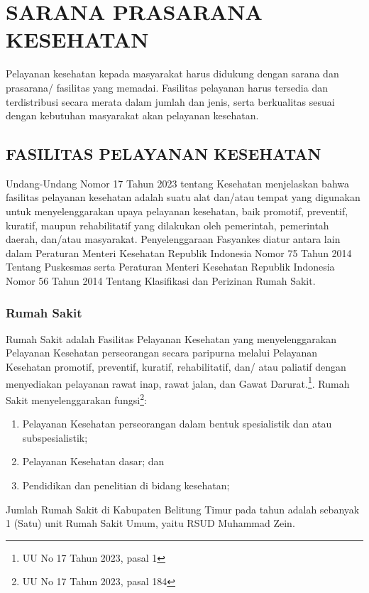 \chapter{SARANA PRASARANA KESEHATAN}
Pelayanan kesehatan kepada masyarakat harus didukung dengan sarana dan prasarana/ fasilitas yang memadai. Fasilitas pelayanan harus tersedia dan terdistribusi secara merata dalam jumlah dan jenis, serta berkualitas sesuai dengan kebutuhan masyarakat akan pelayanan kesehatan. 

\section{FASILITAS PELAYANAN KESEHATAN}
Undang-Undang Nomor 17 Tahun 2023 tentang Kesehatan menjelaskan bahwa fasilitas pelayanan kesehatan adalah suatu alat dan/atau tempat yang digunakan untuk menyelenggarakan upaya pelayanan kesehatan, baik promotif, preventif, kuratif, maupun rehabilitatif yang dilakukan oleh pemerintah, pemerintah daerah, dan/atau masyarakat. Penyelenggaraan Fasyankes diatur antara lain dalam Peraturan Menteri Kesehatan Republik Indonesia Nomor 75 Tahun 2014 Tentang Puskesmas serta Peraturan Menteri Kesehatan Republik Indonesia Nomor 56 Tahun 2014 Tentang Klasifikasi dan Perizinan Rumah Sakit.

\subsection{Rumah Sakit}
Rumah Sakit adalah Fasilitas Pelayanan Kesehatan yang menyelenggarakan Pelayanan Kesehatan perseorangan secara paripurna melalui Pelayanan Kesehatan promotif, preventif, kuratif, rehabilitatif, dan/ atau paliatif dengan menyediakan pelayanan rawat inap, rawat jalan, dan Gawat Darurat.\footnote{UU No 17 Tahun 2023, pasal 1}. Rumah Sakit menyelenggarakan fungsi\footnote{UU No 17 Tahun 2023, pasal 184}:
\begin{enumerate}
  \item Pelayanan Kesehatan perseorangan dalam bentuk spesialistik dan atau subspesialistik;
  \item Pelayanan Kesehatan dasar; dan
  \item Pendidikan dan penelitian di bidang kesehatan;
\end{enumerate}

Jumlah Rumah Sakit di Kabupaten Belitung Timur pada tahun \tP adalah sebanyak 1 (Satu) unit Rumah Sakit Umum, yaitu RSUD Muhammad Zein.

